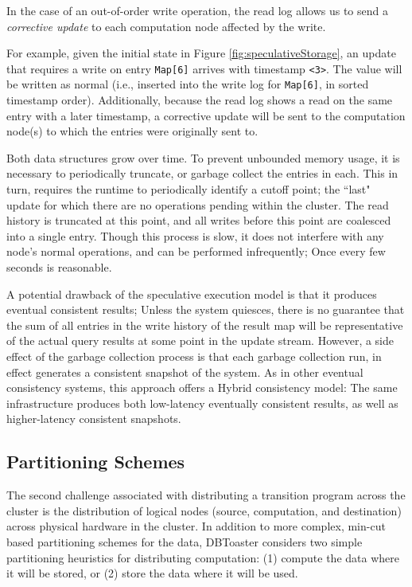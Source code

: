 In the case of an out-of-order write operation, the read log allows us to send a \textit{corrective update} to each computation node affected by the write.  

For example, given the initial state in Figure \ref{fig:speculativeStorage}, an update that requires a write on entry \texttt{Map[6]} arrives with timestamp \texttt{<3>}.  The value will be written as normal (i.e., inserted into the write log for \texttt{Map[6]}, in sorted timestamp order).  Additionally, because the read log shows a read on the same entry with a later timestamp, a corrective update will be sent to the computation node(s) to which the entries were originally sent to.

Both data structures grow over time.  To prevent unbounded memory usage, it is necessary to periodically truncate, or garbage collect the entries in each.  This in turn, requires the runtime to periodically identify a cutoff point; the ``last" update for which there are no operations pending within the cluster.  The read history is truncated at this point, and all writes before this point are coalesced into a single entry.  Though this process is slow, it does not interfere with any node's normal operations, and can be performed infrequently; Once every few seconds is reasonable.

A potential drawback of the speculative execution model is that it produces eventual consistent results; Unless the system quiesces, there is no guarantee that the sum of all entries in the write history of the result map will be representative of the actual query results at some point in the update stream.  However, a side effect of the garbage collection process is that each garbage collection run, in effect generates a consistent snapshot of the system.  As in other eventual consistency systems\cite{bayou}, this approach offers a Hybrid consistency model: The same infrastructure produces both low-latency eventually consistent results, as well as higher-latency consistent snapshots.

\subsection{Partitioning Schemes}
The second challenge associated with distributing a transition program across the cluster is the distribution of logical nodes (source, computation, and destination) across physical hardware in the cluster.  In addition to more complex, min-cut based partitioning schemes for the data, DBToaster considers two simple partitioning heuristics for distributing computation: (1) compute the data where it will be stored, or (2) store the data where it will be used.  


